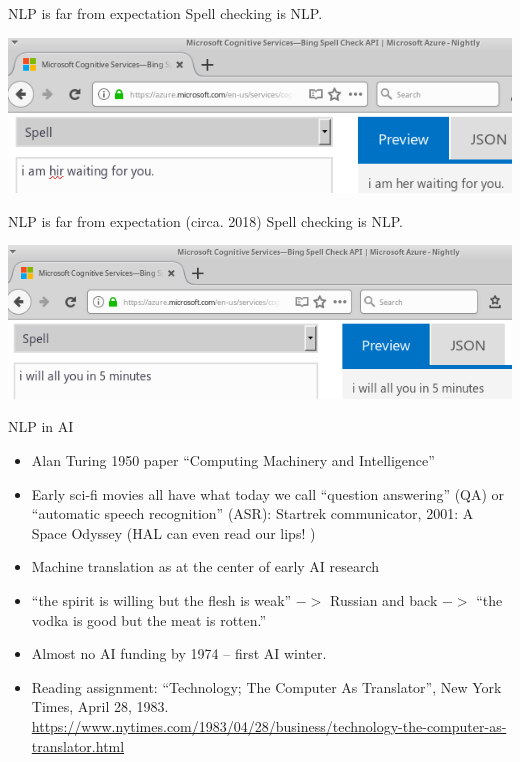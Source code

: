 \documentclass[11pt,handout]{beamer}
\begin{document}
\begin{frame}{NLP is far from expectation}
Spell checking is NLP. 

 \includegraphics[width=\textwidth]{figures/Microsoft_spellchecker_I_hir_waiting_for_you.png} 
\end{frame}

\begin{frame}{NLP is far from expectation (circa. 2018)}
Spell checking is NLP. 

 \includegraphics[width=\textwidth]{figures/Microsoft_spellchecker_I_will_all_you_in_5_minutes.png} 
\end{frame}

\begin{frame}{NLP in AI}
 \begin{itemize}[<+->]
\item Alan Turing 1950 paper   ``Computing Machinery and Intelligence''
\item Early sci-fi movies all have what today we call ``question answering'' (QA) or ``automatic speech recognition'' (ASR): Startrek communicator, 2001: A Space Odyssey (HAL can even read our lips! )
\item Machine translation as at the center of early AI research 
\item ``the spirit is willing but the flesh is weak'' $->$ Russian and back $->$ ``the vodka is good but the meat is rotten.''
\item Almost no AI funding by 1974 -- first AI winter.     
\item Reading assignment: ``Technology; The Computer As Translator'', New York Times, April 28, 1983. \url{https://www.nytimes.com/1983/04/28/business/technology-the-computer-as-translator.html}
\end{itemize}
\end{frame}
\end{document}
